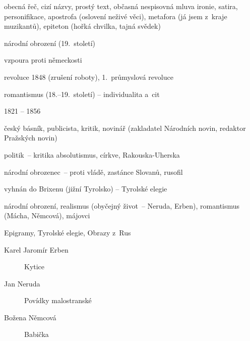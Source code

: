 {\newpart

obecná řeč, cizí názvy, prostý text, občasná nespisovná mluva
ironie, satira, personifikace, apostrofa (oslovení neživé věci), metafora (já
jsem z~kraje muzikantů), epiteton (hořká chvilka, tajná svědek)

\begin{compactitem}
	\item národní obrození (19.~století)
	\item vzpoura proti německosti
	\item revoluce 1848 (zrušení roboty), 1.~průmyslová revoluce
	\item romantismus (18.--19.~století) -- individualita a~cit
\end{compactitem}

\parag{\getauthor}
\begin{compactitem}
\item 1821 -- 1856
\item český básník, publicista, kritik, novinář (zakladatel Národních novin,
	redaktor Pražských novin)
\item politik~-- kritika absolutismus, církve, Rakouska-Uherska
\item národní obrozenec~-- proti vládě, zastánce Slovanů, rusofil
\item vyhnán do Brixenu (jižní Tyrolsko) -- Tyrolské elegie
\item národní obrození, realismus (obyčejný život~-- Neruda, Erben),
	romantismus (Mácha, Němcová), májovci
\item Epigramy, Tyrolské elegie, Obrazy z~Rus
\end{compactitem}

\begin{description}
	\item[Karel Jaromír Erben] Kytice
	\item[Jan Neruda] Povídky malostranské
	\item[Božena Němcová] Babička
\end{description}
}
